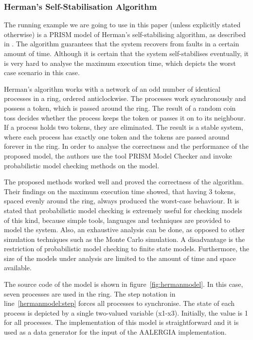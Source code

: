\documentclass[
a4paper,
12pt
]{scrartcl}
\begin{document}
\subsubsection{Herman's Self-Stabilisation Algorithm}
The running example we are going to use in this paper (unless explicitly stated otherwise) is a PRISM model of Herman's self-stabilising algorithm, as described in \cite{Kwiatkowska.2012}. The algorithm guarantees that the system recovers from faults in a certain amount of time. Although it is certain that the system self-stabilises eventually, it is very hard to analyse the maximum execution time, which depicts the worst case scenario in this case.
\par Herman's algorithm works with a network of an odd number of identical processes in a ring, ordered anticlockwise. The processes work synchronously and possess a token, which is passed around the ring. The result of a random coin toss decides whether the process keeps the token or passes it on to its neighbour. If a process holds two tokens, they are eliminated. The result is a stable system, where each process has exactly one token and the tokens are passed around forever in the ring. In order to analyse the correctness and the performance of the proposed model, the authors use the tool PRISM Model Checker and invoke probabilistic model checking methods on the model.
\par The proposed methods worked well and proved the correctness of the algorithm. Their findings on the maximum execution time showed, that having 3 tokens, spaced evenly around the ring, always produced the worst-case behaviour. It is stated that probabilistic model checking is extremely useful for checking models of this kind, because simple tools, languages and techniques are provided to model the system. Also, an exhaustive analysis can be done, as opposed to other simulation techniques such as the Monte Carlo simulation. A disadvantage is the restriction of probabilistic model checking to finite state models. Furthermore, the size of the models under analysis are limited to the amount of time and space available.
\par The source code of the model is shown in figure~\ref{fig:hermanmodel}. In this case, seven processes are used in the ring. The step notation in line~\ref{hermanmodel:step} forces all processes to synchronise. The state of each process is depicted by a single two-valued variable (x1-x3). Initially, the value is 1 for all processes. The implementation of this model is straightforward and it is used as a data generator for the input of the AALERGIA implementation. 
\end{document}
